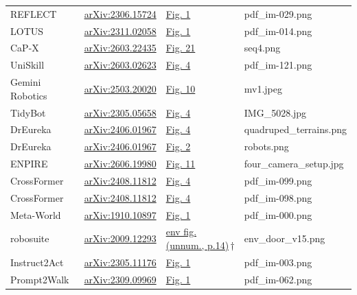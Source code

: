 \documentclass[acmsmall,review,anonymous]{acmart}
\begin{document}
\begin{table}[t]
\begin{tabular}{@{}llll@{}}
REFLECT & \href{https://arxiv.org/abs/2306.15724}{arXiv:2306.15724} & \href{https://arxiv.org/abs/2306.15724}{Fig. 1} & pdf\_im-029.png \\
LOTUS & \href{https://arxiv.org/abs/2311.02058}{arXiv:2311.02058} & \href{https://arxiv.org/abs/2311.02058}{Fig. 1} & pdf\_im-014.png \\
CaP-X & \href{https://arxiv.org/abs/2603.22435}{arXiv:2603.22435} & \href{https://arxiv.org/abs/2603.22435}{Fig. 21} & seq4.png \\
UniSkill & \href{https://arxiv.org/abs/2603.02623}{arXiv:2603.02623} & \href{https://arxiv.org/abs/2603.02623}{Fig. 4} & pdf\_im-121.png \\
Gemini Robotics & \href{https://arxiv.org/abs/2503.20020}{arXiv:2503.20020} & \href{https://arxiv.org/abs/2503.20020}{Fig. 10} & mv1.jpeg \\
TidyBot & \href{https://arxiv.org/abs/2305.05658}{arXiv:2305.05658} & \href{https://arxiv.org/abs/2305.05658}{Fig. 4} & IMG\_5028.jpg \\
DrEureka & \href{https://arxiv.org/abs/2406.01967}{arXiv:2406.01967} & \href{https://arxiv.org/abs/2406.01967}{Fig. 4} & quadruped\_terrains.png \\
DrEureka & \href{https://arxiv.org/abs/2406.01967}{arXiv:2406.01967} & \href{https://arxiv.org/abs/2406.01967}{Fig. 2} & robots.png \\
ENPIRE & \href{https://arxiv.org/abs/2606.19980}{arXiv:2606.19980} & \href{https://arxiv.org/abs/2606.19980}{Fig. 11} & four\_camera\_setup.jpg \\
CrossFormer & \href{https://arxiv.org/abs/2408.11812}{arXiv:2408.11812} & \href{https://arxiv.org/abs/2408.11812}{Fig. 4} & pdf\_im-099.png \\
CrossFormer & \href{https://arxiv.org/abs/2408.11812}{arXiv:2408.11812} & \href{https://arxiv.org/abs/2408.11812}{Fig. 4} & pdf\_im-098.png \\
Meta-World & \href{https://arxiv.org/abs/1910.10897}{arXiv:1910.10897} & \href{https://arxiv.org/abs/1910.10897}{Fig. 1} & pdf\_im-000.png \\
robosuite & \href{https://arxiv.org/abs/2009.12293}{arXiv:2009.12293} & \href{https://arxiv.org/abs/2009.12293}{env fig. (unnum., p.14)}\,$\dagger$ & env\_door\_v15.png \\
Instruct2Act & \href{https://arxiv.org/abs/2305.11176}{arXiv:2305.11176} & \href{https://arxiv.org/abs/2305.11176}{Fig. 1} & pdf\_im-003.png \\
Prompt2Walk & \href{https://arxiv.org/abs/2309.09969}{arXiv:2309.09969} & \href{https://arxiv.org/abs/2309.09969}{Fig. 1} & pdf\_im-062.png \\

\end{tabular}
\end{table}
\end{document}
